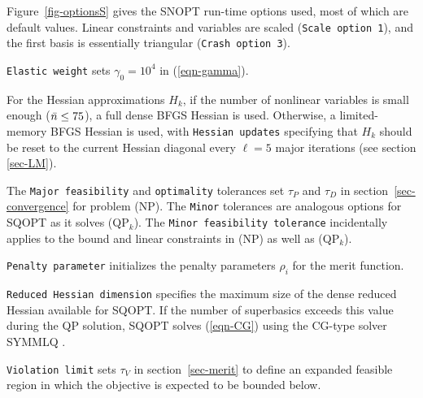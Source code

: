 \documentclass[draft,leqno,onefignum,onetabnum]{siamltex}
\def\D{_{\scriptscriptstyle D}}
\def\nbar{\skew2\bar n}
\def\P{_{\scriptscriptstyle P}}
\def\V{_{\scriptscriptstyle V}}
\def\QPk {QP$_k$}
\def\v#1{\texttt{#1}}
\def\SNOPT {{\small SNOPT}}
\def\SQOPT {{\small SQOPT}}
\def\SYMMLQ{{\small SYMMLQ}}
\begin{document}
Figure~\ref{fig-optionsS} gives the \SNOPT{} run-time options used,
most of which are default values.  Linear constraints and variables
are scaled (\v{Scale option 1}), and the first basis is
essentially triangular (\v{Crash option 3}).

\v{Elastic weight} sets  $\gamma_0 = 10^4$ in (\ref{eqn-gamma}).

 For the Hessian approximations $H_k$, if the number of
nonlinear variables is small enough ($\nbar \le 75$), a full dense
BFGS Hessian is used. Otherwise, a limited-memory BFGS Hessian is
used, with \v{Hessian updates} specifying that $H_k$ should
be reset to the current Hessian diagonal every $\ell = 5$
major iterations (see section \ref{sec-LM}).

The \v{Major feasibility} and \v{optimality} tolerances
set $\tau\P$ and $\tau\D$ in section~\ref{sec-convergence} for problem (NP)\@.
The \v{Minor} tolerances are analogous options for \SQOPT{} as it
solves (\QPk).  The \v{Minor feasibility tolerance} incidentally applies
to the bound and linear constraints in (NP) as well as (\QPk).

\v{Penalty parameter} initializes the penalty parameters
$\rho_i$ for the merit function.

\v{Reduced Hessian dimension} specifies the maximum size of the
dense reduced Hessian available for \SQOPT. If the number of
superbasics exceeds this value during the QP solution,
\SQOPT{} solves (\ref{eqn-CG}) using the CG-type solver \SYMMLQ{}
\cite{PaiS75}.

\v{Violation limit} sets $\tau\V$ in section~\ref{sec-merit}
to define an expanded feasible region in which the objective is
expected to be bounded below.
\end{document}
